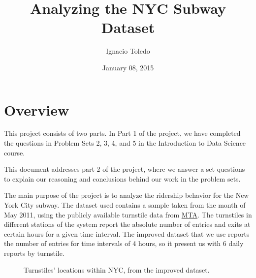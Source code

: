 \documentclass[a4paper,12pt,english]{sphinxmanual}
\title{Analyzing the NYC Subway Dataset}
\date{January 08, 2015}
\author{Ignacio Toledo}
\begin{document}
\maketitle
\tableofcontents
{}\label{index::doc}



\chapter{Overview}
\label{overview:overview}\label{overview::doc}\label{overview:analyzing-the-nyc-subway-dataset}
This project consists of two parts. In Part 1 of the project, we have completed
the questions in Problem Sets 2, 3, 4, and 5 in the Introduction to
Data Science course.

This document addresses part 2 of the project, where we answer a set questions
to explain our reasoning and conclusions behind our work in the problem sets.

The main purpose of the project is to analyze the ridership behavior for the
New York City subway. The dataset used contains a sample taken from the month
of May 2011, using the publicly available turnstile data from
\href{http://web.mta.info/developers/turnstile.html}{MTA}. The turnstiles in
different stations of the system report the absolute number of entries and exits
at certain hours for a given time interval. The improved dataset that we use
reports the number of entries for time intervals of 4 hours, so it present us
with 6 daily reports by turnstile.
\begin{figure}[htbp]
\centering
\capstart

\caption{Turnstiles' locations within NYC, from the improved dataset.}\end{figure}
\end{document}
